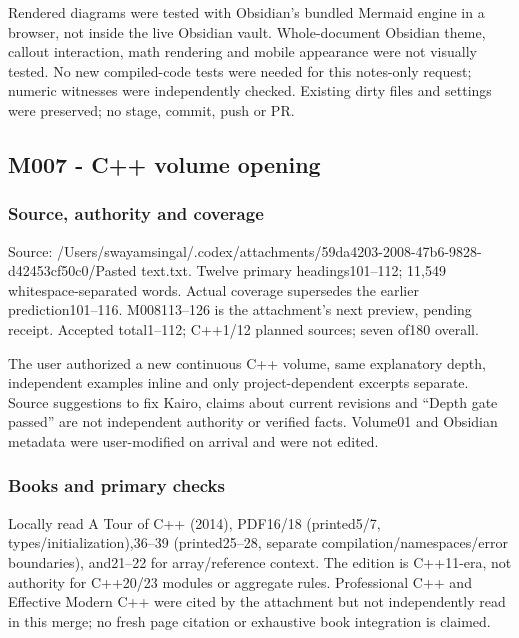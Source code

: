 \hypertarget{appendix-a103e7846d21-limits}{}

Rendered diagrams were tested with Obsidian's bundled Mermaid engine in a browser, not inside the live Obsidian vault. Whole-document Obsidian theme, callout interaction, math rendering and mobile appearance were not visually tested. No new compiled-code tests were needed for this notes-only request; numeric witnesses were independently checked. Existing dirty files and settings were preserved; no stage, commit, push or PR.

\subsection{M007 - C++ volume opening}\label{appendix-a103e7846d21-m007---c-volume-opening}

\hypertarget{appendix-a103e7846d21-m007---c-volume-opening}{}

\subsubsection{Source, authority and coverage}\label{appendix-a103e7846d21-source-authority-and-coverage}

\hypertarget{appendix-a103e7846d21-source-authority-and-coverage}{}

Source: /Users/swayamsingal/.codex/attachments/59da4203-2008-47b6-9828-d42453cf50c0/Pasted text.txt. Twelve primary headings101--112; 11,549 whitespace-separated words. Actual coverage supersedes the earlier prediction101--116. M008113--126 is the attachment's next preview, pending receipt. Accepted total1--112; C++1/12 planned sources; seven of180 overall.

The user authorized a new continuous C++ volume, same explanatory depth, independent examples inline and only project-dependent excerpts separate. Source suggestions to fix Kairo, claims about current revisions and ``Depth gate passed'' are not independent authority or verified facts. Volume01 and Obsidian metadata were user-modified on arrival and were not edited.

\subsubsection{Books and primary checks}\label{appendix-a103e7846d21-books-and-primary-checks}

\hypertarget{appendix-a103e7846d21-books-and-primary-checks}{}

Locally read A Tour of C++ (2014), PDF16/18 (printed5/7, types/initialization),36--39 (printed25--28, separate compilation/namespaces/error boundaries), and21--22 for array/reference context. The edition is C++11-era, not authority for C++20/23 modules or aggregate rules. Professional C++ and Effective Modern C++ were cited by the attachment but not independently read in this merge; no fresh page citation or exhaustive book integration is claimed.

